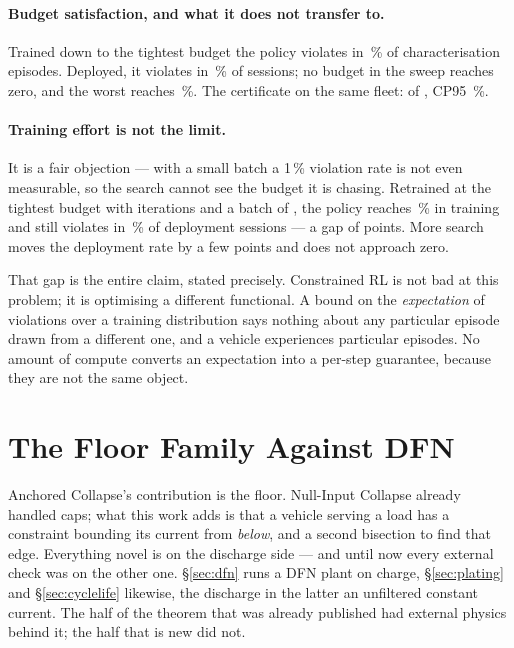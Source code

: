 \documentclass[11pt,letterpaper]{article}
\theoremstyle{definition}
\theoremstyle{remark}
\begin{document}
\paragraph{Budget satisfaction, and what it does not transfer to.} Trained down to the tightest budget the
policy violates in \rlBestTrain\,\% of characterisation episodes. Deployed, it violates in
\rlBestDeploy\,\% of sessions; no budget in the sweep reaches zero, and the worst reaches
\rlWorst\,\%. The certificate on the same fleet: \rlZgViol{} of \rlTrials, CP95 \rlZgCP\,\%.

\paragraph{Training effort is not the limit.} It is
a fair objection --- with a small batch a 1\,\% violation rate is not even measurable, so the
search cannot see the budget it is chasing. Retrained at the tightest budget with
\rlHardIters{} iterations and a batch of \rlHardBatch, the policy reaches \rlHardTrain\,\% in
training and still violates in \rlHardDeploy\,\% of deployment sessions --- a gap of
\rlGapPoints{} points. More search moves the deployment rate by a few points and does not
approach zero.

That gap is the entire claim, stated precisely. Constrained RL is not bad at this problem; it is
optimising a different functional. A bound on the \emph{expectation} of violations over a
training distribution says nothing about any particular episode drawn from a different one, and
a vehicle experiences particular episodes. No amount of compute converts an expectation into a
per-step guarantee, because they are not the same object.


\section{The Floor Family Against DFN}\label{sec:dfndischarge}

Anchored Collapse's contribution is the floor. Null-Input Collapse already handled caps; what
this work adds is that a vehicle serving a load has a constraint bounding its current from
\emph{below}, and a second bisection to find that edge. Everything novel is on the discharge
side --- and until now every external check was on the other one. \S\ref{sec:dfn} runs a DFN
plant on charge, \S\ref{sec:plating} and \S\ref{sec:cyclelife} likewise, the discharge in the
latter an unfiltered constant current. The half of the theorem that was already published had
external physics behind it; the half that is new did not.
\end{document}
